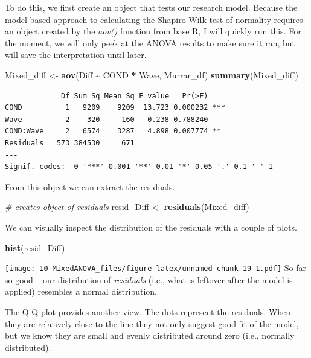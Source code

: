 \documentclass[
  11pt,
]{book}
\newenvironment{Shaded}{\begin{snugshade}}{\end{snugshade}}
\newcommand{\CommentTok}[1]{\textcolor[rgb]{0.37,0.37,0.37}{\textit{#1}}}
\newcommand{\FunctionTok}[1]{\textcolor[rgb]{0.27,0.27,0.27}{\textbf{#1}}}
\newcommand{\NormalTok}[1]{#1}
\newcommand{\OtherTok}[1]{\textcolor[rgb]{0.37,0.37,0.37}{#1}}
\newcommand{\SpecialCharTok}[1]{\textcolor[rgb]{0.43,0.43,0.43}{\textbf{#1}}}
\begin{document}
To do this, we first create an object that tests our research model. Because the model-based approach to calculating the Shapiro-Wilk test of normality requires an object created by the \emph{aov()} function from base R, I will quickly run this. For the moment, we will only peek at the ANOVA results to make sure it ran, but will save the interpretation until later.

\begin{Shaded}
\begin{Highlighting}[]
\NormalTok{Mixed\_diff }\OtherTok{\textless{}{-}} \FunctionTok{aov}\NormalTok{(Diff }\SpecialCharTok{\textasciitilde{}}\NormalTok{ COND }\SpecialCharTok{*}\NormalTok{ Wave, Murrar\_df)}
\FunctionTok{summary}\NormalTok{(Mixed\_diff)}
\end{Highlighting}
\end{Shaded}

\begin{verbatim}
             Df Sum Sq Mean Sq F value   Pr(>F)    
COND          1   9209    9209  13.723 0.000232 ***
Wave          2    320     160   0.238 0.788240    
COND:Wave     2   6574    3287   4.898 0.007774 ** 
Residuals   573 384530     671                     
---
Signif. codes:  0 '***' 0.001 '**' 0.01 '*' 0.05 '.' 0.1 ' ' 1
\end{verbatim}

From this object we can extract the residuals.

\begin{Shaded}
\begin{Highlighting}[]
\CommentTok{\# creates object of residuals}
\NormalTok{resid\_Diff }\OtherTok{\textless{}{-}} \FunctionTok{residuals}\NormalTok{(Mixed\_diff)}
\end{Highlighting}
\end{Shaded}

We can visually inspect the distribution of the residuals with a couple of plots.

\begin{Shaded}
\begin{Highlighting}[]
\FunctionTok{hist}\NormalTok{(resid\_Diff)}
\end{Highlighting}
\end{Shaded}

\texttt{[image: 10-MixedANOVA\_files/figure-latex/unnamed-chunk-19-1.pdf]} So far so good -- our distribution of \emph{residuals} (i.e., what is leftover after the model is applied) resembles a normal distribution.

The Q-Q plot provides another view. The dots represent the residuals. When they are relatively close to the line they not only suggest good fit of the model, but we know they are small and evenly distributed around zero (i.e., normally distributed).
\end{document}
